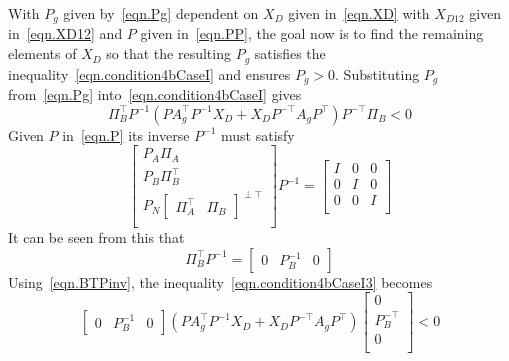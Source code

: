 \documentclass[journal]{IEEEtran}
\theoremstyle{innercustomthm}
\begin{document}
  With $P_{g}$ given by\ \eqref{eqn.Pg} dependent on $X_{D}$ given in\ \eqref{eqn.XD} with $X_{D12}$ given in\ \eqref{eqn.XD12} and $P$ given in\ \eqref{eqn.PP}, the goal now is to find the remaining elements of $X_{D}$ so that the resulting $P_{g}$ satisfies the inequality\ \eqref{eqn.condition4bCaseI} and ensures $P_{g}>0$.
  Substituting $P_{g}$ from\ \eqref{eqn.Pg} into\ \eqref{eqn.condition4bCaseI} gives
  {%
    \small
    \begin{equation}
      \label{eqn.condition4bCaseI3}
      \Pi_{B}^{\top}P^{-1} (PA_{g}^{\top}P^{-1}X_{D} + X_{D}P^{-\top}A_{g}P^{\top}) P^{-\top}\Pi_{B} < 0
    \end{equation}
  }%
  Given $P$ in\ \eqref{eqn.P} its inverse $P^{-1}$ must satisfy
  \begin{equation}
    \label{eqn.PexpandedTimesPinv}
    \begin{bmatrix}
      P_{A}\Pi_{A} \\
      P_{B}\Pi_{B}^{\top} \\
      P_{N}
      \begin{bmatrix}
        \Pi_{A}^{\top} & \Pi_{B}
      \end{bmatrix}^{\perp\top} \\
    \end{bmatrix}
    P^{-1}
    =
    \begin{bmatrix}
      I & 0 & 0 \\
      0 & I & 0 \\
      0 & 0 & I \\
    \end{bmatrix}
  \end{equation}
  It can be seen from this that
  \begin{equation}
    \label{eqn.BTPinv}
    \Pi_{B}^{\top}P^{-1} =
    \begin{bmatrix}
      0 & P_{B}^{-1} & 0
    \end{bmatrix}
  \end{equation}
  Using\ \eqref{eqn.BTPinv}, the inequality\ \eqref{eqn.condition4bCaseI3} becomes
  {%
    \small
    \begin{equation}
      \label{eqn.condition4bCaseI4}
      \begin{bmatrix}
        0 & P_{B}^{-1} & 0
      \end{bmatrix}
      (PA_{g}^{\top}P^{-1}X_{D} + X_{D}P^{-\top}A_{g}P^{\top})
      \begin{bmatrix}
        0 \\
        P_{B}^{-\top} \\
        0 \\
      \end{bmatrix}
      < 0
    \end{equation}
  }%
\end{document}
